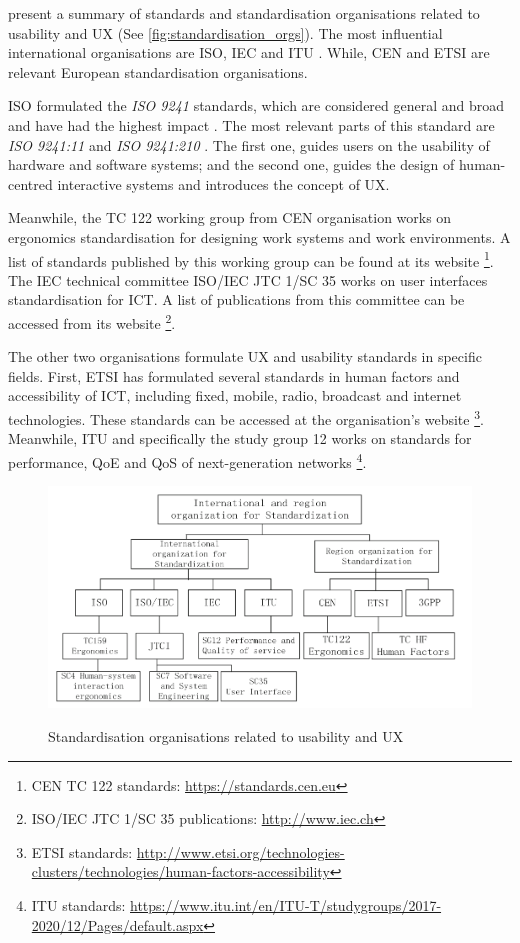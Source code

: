\textcite{Ran2015} present a summary of standards and standardisation organisations related to usability and \ac{UX} (See \autoref{fig:standardisation_orgs}). The most influential international organisations are \ac{ISO}, \ac{IEC} and \ac{ITU} \autocite{Ran2015}. While, \ac{CEN} and \ac{ETSI} are relevant European standardisation organisations.

\ac{ISO} formulated the \textit{ISO 9241} standards, which are considered general and broad and have had the highest impact \autocite{Ran2015}. The most relevant parts of this standard are \textit{ISO 9241:11} \autocite{iso9241:11} and \textit{ISO 9241:210} \autocite{iso9241:210}. The first one, guides users on the usability of hardware and software systems; and the second one, guides the design of human-centred interactive systems and introduces the concept of \ac{UX}.

Meanwhile, the TC 122 working group from \ac{CEN} organisation works on ergonomics standardisation for designing work systems and work environments. A list of standards published by this working group can be found at its website \footnote{\ac{CEN} TC 122 standards: \url{https://standards.cen.eu}}. The \ac{IEC} technical committee ISO/IEC JTC 1/SC 35 works on user interfaces standardisation for \ac{ICT}. A list of publications from this committee can be accessed from its website \footnote{ISO/IEC JTC 1/SC 35 publications: \url{http://www.iec.ch}}.

The other two organisations formulate \ac{UX} and usability standards in specific fields. First, \ac{ETSI} has formulated several standards in human factors and accessibility of \ac{ICT}, including fixed, mobile, radio, broadcast and internet technologies. These standards can be accessed at the organisation's website \footnote{\ac{ETSI} standards: \url{http://www.etsi.org/technologies-clusters/technologies/human-factors-accessibility}}. Meanwhile, \ac{ITU} and specifically the study group 12 works on standards for performance, \ac{QoE} and \ac{QoS} of next-generation networks \footnote{\ac{ITU} standards: \url{https://www.itu.int/en/ITU-T/studygroups/2017-2020/12/Pages/default.aspx}}.

\begin{figure}[htb]
\myfloatalign
{\includegraphics[width=\linewidth]{gfx/standard/standardisation_orgs}} \quad
\caption[Standardisation organisations related to usability and \ac{UX}]{Standardisation organisations related to usability and \ac{UX} \autocite{Ran2015}}\label{fig:standardisation_orgs}
\end{figure}

